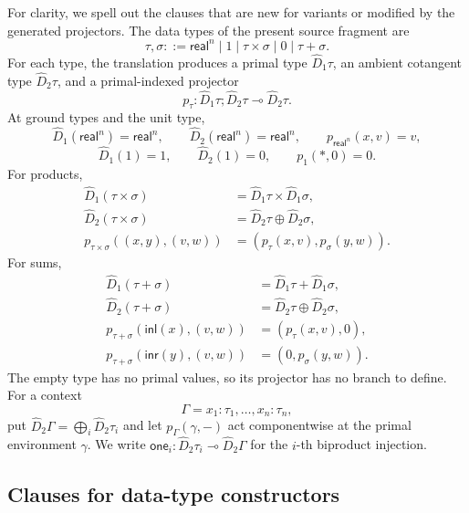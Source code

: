 \documentclass[runningheads,envcountsame]{llncs}
\newcommand{\onehot}{\mathsf{one}}
\begin{document}
For clarity, we spell out the clauses that are new for variants or modified by the generated projectors. The data types of the present source fragment are
$$
\tau,\sigma::=
\mathsf{real}^n
\mid 1
\mid \tau\times\sigma
\mid 0
\mid \tau+\sigma.
$$
For each type, the translation produces a primal type $\widehat D_1\tau$, an ambient cotangent type $\widehat D_2\tau$, and a primal-indexed projector
$$
p_\tau:
\widehat D_1\tau;
\widehat D_2\tau
\multimap
\widehat D_2\tau.
$$
At ground types and the unit type,
$$
\widehat D_1(\mathsf{real}^n)=\mathsf{real}^n,
\qquad
\widehat D_2(\mathsf{real}^n)=\mathsf{real}^n,
\qquad
p_{\mathsf{real}^n}(x,v)=v,
$$
$$
\widehat D_1(1)=1,
\qquad
\widehat D_2(1)=0,
\qquad
p_1(*,0)=0.
$$
For products,
$$
\begin{aligned}
\widehat D_1(\tau\times\sigma)
&=\widehat D_1\tau\times\widehat D_1\sigma,\\
\widehat D_2(\tau\times\sigma)
&=\widehat D_2\tau\oplus\widehat D_2\sigma,\\
p_{\tau\times\sigma}((x,y),(v,w))
&=(p_\tau(x,v),p_\sigma(y,w)).
\end{aligned}
$$
For sums,
$$
\begin{aligned}
\widehat D_1(\tau+\sigma)
&=\widehat D_1\tau+\widehat D_1\sigma,\\
\widehat D_2(\tau+\sigma)
&=\widehat D_2\tau\oplus\widehat D_2\sigma,\\
p_{\tau+\sigma}(\mathsf{inl}(x),(v,w))
&=(p_\tau(x,v),0),\\
p_{\tau+\sigma}(\mathsf{inr}(y),(v,w))
&=(0,p_\sigma(y,w)).
\end{aligned}
$$
The empty type has no primal values, so its projector has no branch to define. For a context
$$
\Gamma=x_1:\tau_1,\ldots,x_n:\tau_n,
$$
put $\widehat D_2\Gamma=\bigoplus_i\widehat D_2\tau_i$ and let
$p_\Gamma(\gamma,-)$ act componentwise at the primal environment $\gamma$.
We write $\onehot_i:\widehat D_2\tau_i\multimap\widehat D_2\Gamma$ for the
$i$-th biproduct injection.

\subsection{Clauses for data-type constructors}
\end{document}
